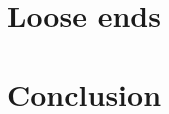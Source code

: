 \documentclass[12pt,vi]{mitthesis}
\begin{document}

\pagestyle{\currentpagestyle}






\section{Loose ends}


\section{Conclusion}



\end{document}
